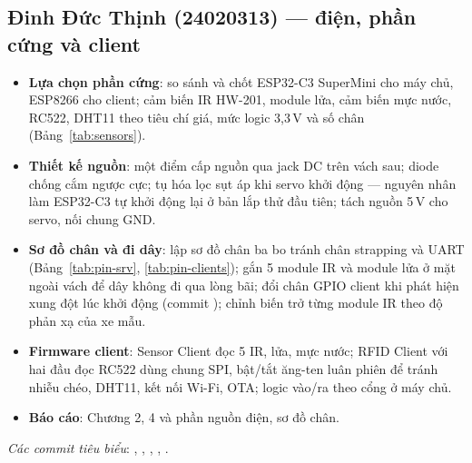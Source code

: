 \subsection{Đinh Đức Thịnh (24020313) — điện, phần cứng và client}
\begin{itemize}
  \item \textbf{Lựa chọn phần cứng}: so sánh và chốt ESP32-C3 SuperMini cho máy chủ,
        ESP8266 cho client; cảm biến IR HW-201, module lửa, cảm biến mực nước, RC522,
        DHT11 theo tiêu chí giá, mức logic 3,3\,V và số chân (Bảng~\ref{tab:sensors}).
  \item \textbf{Thiết kế nguồn}: một điểm cấp nguồn qua jack DC trên vách sau; diode
        chống cắm ngược cực; tụ hóa lọc sụt áp khi servo khởi động — nguyên nhân làm
        ESP32-C3 tự khởi động lại ở bản lắp thử đầu tiên; tách nguồn 5\,V cho servo, nối chung GND.
  \item \textbf{Sơ đồ chân và đi dây}: lập sơ đồ chân ba bo tránh chân strapping và UART
        (Bảng~\ref{tab:pin-srv}, \ref{tab:pin-clients}); gắn 5 module IR và module lửa ở
        mặt ngoài vách để dây không đi qua lòng bãi; đổi chân GPIO client khi phát hiện
        xung đột lúc khởi động (commit ); chỉnh biến trở
        từng module IR theo độ phản xạ của xe mẫu.
  \item \textbf{Firmware client}: Sensor Client đọc 5 IR, lửa, mực nước; RFID Client với
        hai đầu đọc RC522 dùng chung SPI, bật/tắt ăng-ten luân phiên để tránh nhiễu chéo,
        DHT11, kết nối Wi-Fi, OTA; logic vào/ra theo cổng ở máy chủ.
  \item \textbf{Báo cáo}: Chương 2, 4 và phần nguồn điện, sơ đồ chân.
\end{itemize}
\textit{Các commit tiêu biểu}: ,
, ,
, .

